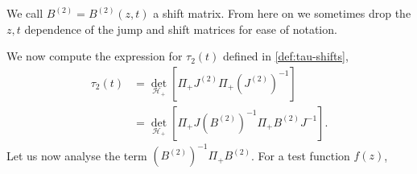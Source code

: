 \documentclass[a4paper,reqno,11pt]{amsart}
\numberwithin{equation}{section}
\numberwithin{figure}{section}
\theoremstyle{plain}
\theoremstyle{remark}
\numberwithin{rhp}{section}
\begin{document}
We call $B^{(2)}=B^{(2)}(z,t)$ a shift matrix.
From here on we sometimes drop the $z,t$ dependence of the jump and shift matrices for ease of notation.

We now compute the expression for $\tau_2(t)$ defined in \eqref{def:tau-shifts},
\begin{align}
    \tau_2(t) &= \det_{\mathcal{H}_{+}} \left[ \Pi_{+} J^{(2)} \Pi_{+} (J^{(2)})^{-1} \right]\\
    &= \det_{\mathcal{H}_{+}} \left[ \Pi_{+}{J} (B^{(2)})^{-1} \Pi_{+} B^{(2)} {J}^{-1} \right].\label{eq:tautilde1}
\end{align}
Let us now analyse the term $   (B^{(2)})^{-1} \Pi_{+} B^{(2)}$. For a test function $f(z)$,
\end{document}
